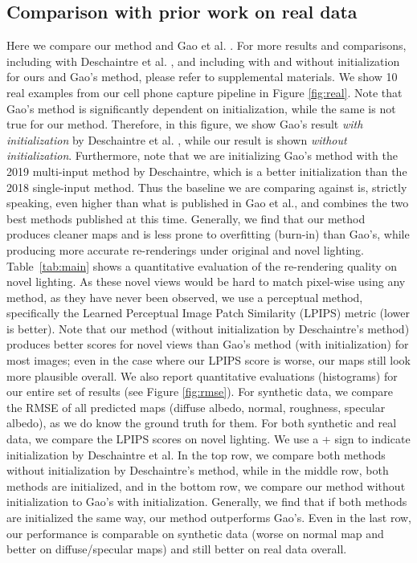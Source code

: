 \subsection{Comparison with prior work on real data}
\label{ssec:real}
%
Here we compare our method and Gao et al. . For more results and comparisons, including with Deschaintre et al. , and including with and without initialization for ours and Gao's method, please refer to supplemental materials.
%
We show 10 real examples from our cell phone capture pipeline in Figure \ref{fig:real}. Note that Gao's method is significantly dependent on initialization, while the same is not true for our method. Therefore, in this figure, we show Gao's result \emph{with initialization} by Deschaintre et al. , while our result is shown \emph{without initialization}.
%
Furthermore, note that we are initializing Gao's method with the 2019 multi-input method by Deschaintre, which is a better initialization than the 2018 single-input method. Thus the baseline we are comparing against is, strictly speaking, even higher than what is published in Gao et al., and combines the two best methods published at this time.
%
Generally, we find that our method produces cleaner maps and is less prone to overfitting (burn-in) than Gao's, while producing more accurate re-renderings under original and novel lighting. Table~\ref{tab:main} shows a quantitative evaluation of the re-rendering quality on novel lighting. As these novel views would be hard to match pixel-wise using any method, as they have never been observed, we use a perceptual method, specifically the Learned Perceptual Image Patch Similarity (LPIPS) metric \cite{LPIPS} (lower is better). Note that our method (without initialization by Deschaintre's method) produces better scores for novel views than Gao's method (with initialization) for most images; even in the case where our LPIPS score is worse, our maps still look more plausible overall.
%
We also report quantitative evaluations (histograms) for our entire set of results (see Figure \ref{fig:rmse}). For synthetic data, we compare the RMSE of all predicted maps (diffuse albedo, normal, roughness, specular albedo), as we do know the ground truth for them. For both synthetic and real data, we compare the LPIPS scores on novel lighting. We use a + sign to indicate initialization by Deschaintre et al. In the top row, we compare both methods without initialization by Deschaintre's method, while in the middle row, both methods are initialized, and in the bottom row, we compare our method without initialization to Gao's with initialization. Generally, we find that if both methods are initialized the same way, our method outperforms Gao's. Even in the last row, our performance is comparable on synthetic data (worse on normal map and better on diffuse/specular maps) and still better on real data overall.
%

%
